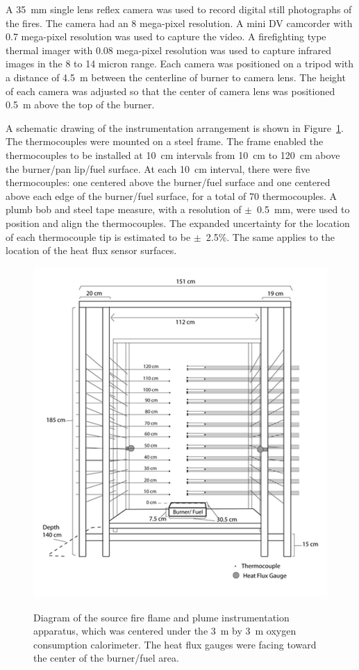 \documentclass[twoside]{uocthesis}
\begin{document}
{A 35~mm single lens reflex camera was used to record digital still photographs of the fires.  The camera had an 8 mega-pixel resolution.  A mini DV camcorder with 0.7 mega-pixel resolution was used to capture the video.  A firefighting type thermal imager with 0.08 mega-pixel resolution was used to capture infrared images in the 8 to 14 micron range.  Each camera was positioned on a tripod with a distance of 4.5~m between the centerline of burner to camera lens.  The height of each camera was adjusted so that the center of camera lens was positioned 0.5~m above the top of the burner.

A schematic drawing of the instrumentation arrangement is shown in Figure~\ref{Drawing_Fire_Flamer}.  The thermocouples were mounted on a steel frame.  The frame enabled the thermocouples to be installed at 10~cm intervals from 10~cm to 120~cm above the burner/pan lip/fuel surface. At each 10~cm interval, there were five thermocouples: one centered above the burner/fuel surface and one centered above each edge of the burner/fuel surface, for a total of 70 thermocouples.  A plumb bob and steel tape measure, with a resolution of $\pm$~0.5~mm, were used to position and align the thermocouples.   The expanded uncertainty for the location of each thermocouple tip is estimated to be $\pm$~2.5\%.  The same applies to the location of the heat flux sensor surfaces.

\begin{figure}
  \centering
  \includegraphics[width=\textwidth]{../Figures/Schematic_Drawing}\\
  \caption[Diagram of the source fire flame and plume instrumentation apparatus]{Diagram of the source fire flame and plume instrumentation apparatus, which was centered under the 3~m by 3~m oxygen consumption calorimeter.  The heat flux gauges were facing toward the center of the burner/fuel area.}
  \label{Drawing_Fire_Flamer}
\end{figure}

}
\end{document}
